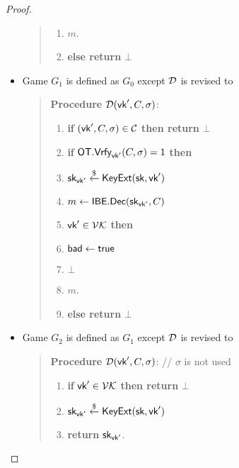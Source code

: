 \documentclass[12pt]{article}
\newcommand{\getsr}{\stackrel{\$}{\gets}}
\newcommand{\tab}{\hspace{0.3in}}
\newcommand{\Vrfy}{\textsf{Vrfy}}
\newcommand{\true}{\textsf{true}}
\newcommand{\C}{\mathcal{C}}
\theoremstyle{definition}
\newcommand{\Enc}{\textsf{Enc}}
\newcommand{\Dec}{\textsf{Dec}}
\newcommand{\pk}{\textsf{pk}}
\newcommand{\sk}{\textsf{sk}}
\newcommand{\LR}{\textsf{LR}}
\begin{document}
\begin{proof}
\begin{itemize}
\begin{quote}
\begin{enumerate}
\item \tab {\bf return} $m$.
\item {\bf else return} $\bot$
\end{enumerate}
\end{quote}
\item Game $G_1$ is defined as $G_0$ except $\mathcal{D}$ is revised to
\begin{quote}
{\bf Procedure} $\mathcal{D}(\textsf{vk}', C,\sigma)$:
\begin{enumerate}
\item {\bf if} $(\vk', C,\sigma) \in \C$ {\bf then return} $\bot$
\item {\bf if} $\OT.\Vrfy_{\vk'}(C,\sigma)=1$ {\bf then}
\item \tab $\sk_{\vk'} \getsr \KeyExt(\sk, \vk')$
\item \tab $m \gets \IBE.\Dec(\sk_{\vk'}, C)$
\item \tab {\bf if} $\textsf{vk}' \in \mathcal{VK}$ {\bf then}
\item \tab \tab \tab $\bad \gets \true$
\item \tab \tab \tab {\bf return} $\bot$
\item \tab {\bf return} $m$.
\item {\bf else return} $\bot$
\end{enumerate}
\end{quote}
\item Game $G_2$ is defined as $G_1$ except $\mathcal{D}$ is revised to
\begin{quote}
{\bf Procedure} $\mathcal{D}(\textsf{vk}', C,\sigma)$: // $\sigma$ is not used
\begin{enumerate}
\item {\bf if} $\textsf{vk}' \in \mathcal{VK}$ {\bf then return} $\bot$
\item $\sk_{\vk'} \getsr \KeyExt(\sk, \vk')$
\item {\bf return} $\sk_{\vk'}$.
\end{enumerate}
\end{quote}

\end{itemize}
\end{proof}
\end{document}
